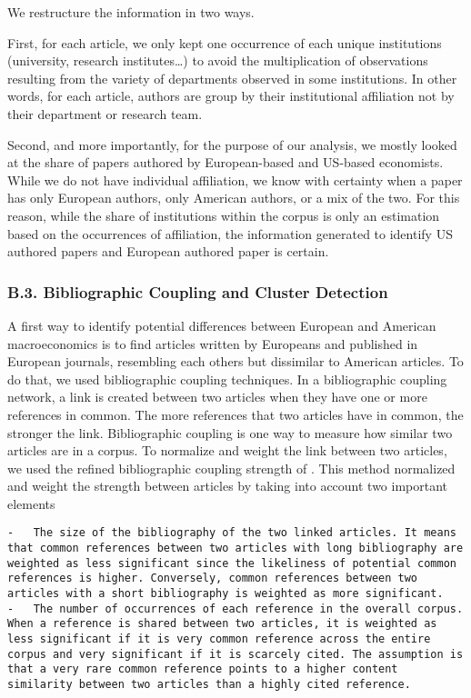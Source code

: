 \documentclass[]{elsarticle} %
\begin{document}
We restructure the information in two ways.

First, for each article, we only kept one occurrence of each unique
institutions (university, research institutes\ldots) to avoid the
multiplication of observations resulting from the variety of departments
observed in some institutions. In other words, for each article, authors
are group by their institutional affiliation not by their department or
research team.

Second, and more importantly, for the purpose of our analysis, we mostly
looked at the share of papers authored by European-based and US-based
economists. While we do not have individual affiliation, we know with
certainty when a paper has only European authors, only American authors,
or a mix of the two. For this reason, while the share of institutions
within the corpus is only an estimation based on the occurrences of
affiliation, the information generated to identify US authored papers
and European authored paper is certain.

\hypertarget{network}{%
\subsubsection*{B.3. Bibliographic Coupling and Cluster
Detection}\label{network}}

A first way to identify potential differences between European and
American macroeconomics is to find articles written by Europeans and
published in European journals, resembling each others but dissimilar to
American articles. To do that, we used bibliographic coupling
techniques. In a bibliographic coupling network, a link is created
between two articles when they have one or more references in common.
The more references that two articles have in common, the stronger the
link. Bibliographic coupling is one way to measure how similar two
articles are in a corpus. To normalize and weight the link between two
articles, we used the refined bibliographic coupling strength of
\citet{shen2019}. This method normalized and weight the strength between
articles by taking into account two important elements

\begin{verbatim}
-   The size of the bibliography of the two linked articles. It means that common references between two articles with long bibliography are weighted as less significant since the likeliness of potential common references is higher. Conversely, common references between two articles with a short bibliography is weighted as more significant.
-   The number of occurrences of each reference in the overall corpus. When a reference is shared between two articles, it is weighted as less significant if it is very common reference across the entire corpus and very significant if it is scarcely cited. The assumption is that a very rare common reference points to a higher content similarity between two articles than a highly cited reference.
\end{verbatim}
\end{document}
